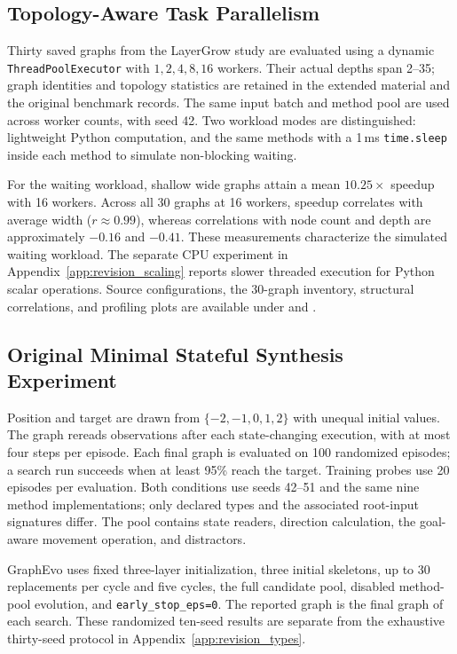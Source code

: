 \subsection{Topology-Aware Task Parallelism}
\label{sec:appendix_exp3}
Thirty saved graphs from the LayerGrow study are evaluated using a dynamic
\texttt{ThreadPoolExecutor} with $1,2,4,8,16$ workers. Their actual depths span
2--35; graph identities and topology statistics are retained in the extended
material and the original benchmark records. The same input batch and method
pool are used across worker counts, with seed 42. Two workload modes are
distinguished: lightweight Python computation, and the same methods with a
1\,ms \texttt{time.sleep} inside each method to simulate non-blocking waiting.

For the waiting workload, shallow wide graphs attain a mean $10.25\times$
speedup with 16 workers. Across all 30 graphs at 16 workers, speedup correlates
with average width ($r\approx0.99$), whereas correlations with node count and
depth are approximately $-0.16$ and $-0.41$. These measurements characterize
the simulated waiting workload. The separate CPU experiment in
Appendix~\ref{app:revision_scaling} reports slower threaded execution for Python
scalar operations. Source configurations, the 30-graph inventory, structural
correlations, and profiling plots are available under
 and .

\subsection{Original Minimal Stateful Synthesis Experiment}
\label{sec:appendix_exp4}
Position and target are drawn from $\{-2,-1,0,1,2\}$ with unequal initial
values. The graph rereads observations after each state-changing execution,
with at most four steps per episode. Each final graph is evaluated on 100
randomized episodes; a search run succeeds when at least 95\% reach the
target. Training probes use 20 episodes per evaluation. Both conditions use
seeds 42--51 and the same nine method implementations; only declared types and
the associated root-input signatures differ. The pool contains state readers,
direction calculation, the goal-aware movement operation, and distractors.

GraphEvo uses fixed three-layer initialization, three initial skeletons, up to
30 replacements per cycle and five cycles, the full candidate pool, disabled
method-pool evolution, and \texttt{early\_stop\_eps=0}. The reported graph is
the final graph of each search. These randomized ten-seed results are separate
from the exhaustive thirty-seed protocol in Appendix~\ref{app:revision_types}.

